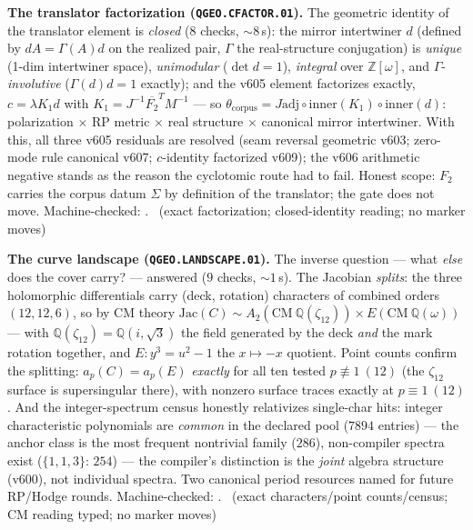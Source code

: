 \par\smallskip\noindent\textbf{The translator factorization
(\texttt{QGEO.CFACTOR.01}).}
The geometric identity of the translator element is \emph{closed}
($8$ checks, ${\sim}8$\,s): the mirror intertwiner $d$ (defined by
$dA=\Gamma(A)d$ on the realized pair, $\Gamma$ the real-structure
conjugation) is \emph{unique} (1-dim intertwiner space),
\emph{unimodular} ($\det d=1$), \emph{integral} over
$\mathbb{Z}[\omega]$, and $\Gamma$-\emph{involutive}
($\Gamma(d)d=1$ exactly); and the v605 element factorizes exactly,
$c=\lambda K_1d$ with $K_1=J^{-1}\overline{F_2}^TM^{-1}$ --- so
$\theta_{\mathrm{corpus}}=J\mathrm{adj}\circ\mathrm{inner}(K_1)\circ
\mathrm{inner}(d)$: polarization $\times$ RP metric $\times$ real
structure $\times$ canonical mirror intertwiner.  With this, all
three v605 residuals are resolved (seam reversal geometric v603;
zero-mode rule canonical v607; $c$-identity factorized v609); the
v606 arithmetic negative stands as the reason the cyclotomic route
had to fail.  Honest scope: $F_2$ carries the corpus datum $\Sigma$
by definition of the translator; the gate does not move.
Machine-checked: .
\mE\ (exact factorization; closed-identity reading; no marker moves)
\par\smallskip

\par\smallskip\noindent\textbf{The curve landscape
(\texttt{QGEO.LANDSCAPE.01}).}
The inverse question --- what \emph{else} does the cover carry? ---
answered ($9$ checks, ${\sim}1$\,s).  The Jacobian \emph{splits}: the
three holomorphic differentials carry (deck, rotation) characters of
combined orders $(12,12,6)$, so by CM theory
$\mathrm{Jac}(C)\sim A_2(\mathrm{CM}\ \mathbb{Q}(\zeta_{12}))\times
E(\mathrm{CM}\ \mathbb{Q}(\omega))$ --- with
$\mathbb{Q}(\zeta_{12})=\mathbb{Q}(i,\sqrt3)$ the field generated by
the deck \emph{and} the mark rotation together, and $E: y^3=u^2-1$
the $x\mapsto-x$ quotient.  Point counts confirm the splitting:
$a_p(C)=a_p(E)$ \emph{exactly} for all ten tested
$p\not\equiv1\ (12)$ (the $\zeta_{12}$ surface is supersingular
there), with nonzero surface traces exactly at $p\equiv1\ (12)$.
And the integer-spectrum census honestly relativizes single-char
hits: integer characteristic polynomials are \emph{common} in the
declared pool ($7894$ entries) --- the anchor class is the most
frequent nontrivial family ($286$), non-compiler spectra exist
($\{1,1,3\}$: $254$) --- the compiler's distinction is the
\emph{joint} algebra structure (v600), not individual spectra.  Two
canonical period resources named for future RP/Hodge rounds.
Machine-checked: .
\mE\ (exact characters/point counts/census; CM reading typed; no
marker moves)
\par\smallskip

